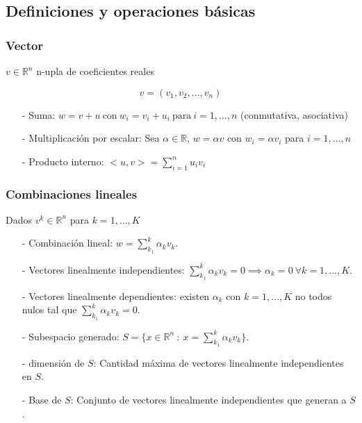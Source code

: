 \subsection{Definiciones y operaciones básicas}\label{subsec:definiciones_y_operaciones_basicas}

\subsubsection{Vector}\label{subsubsec:vector}

$v \in \mathbb{R}^{n}$ n-upla de coeficientes reales

\[ v = (v_1,v_2,\ldots,v_n)\]

\begin{itemize}
    \item[-] Suma: $w = v + u ~\text{con}~ w_i = v_i + u_i ~\text{para}~ i = 1,\ldots,n$ (conmutativa, asociativa)
    \item[-] Multiplicación por escalar: Sea $\alpha \in \mathbb{R}$, $w = \alpha v$ con $w_i = \alpha v_i$ para $i = 1,\ldots,n$
    \item[-] Producto interno: $<u,v> = \sum_{i=1}^{n}u_i v_i$
\end{itemize}

\subsubsection{Combinaciones lineales}\label{subsubsec:combinaciones_lineales}

Dados $v^{k} \in \mathbb{R}^n$ para $k = 1,\ldots,K$

\begin{itemize}
    \item[-] Combinación lineal: $w = \sum_{k_1}^{k}\alpha_k v_{k}$.
    \item[-] Vectores linealmente independientes: $\sum_{k_1}^{k}\alpha_k v_{k} = 0 \implies \alpha_k = 0 ~\forall k = 1,\ldots,K$.
    \item[-] Vectores linealmente dependientes: existen $\alpha_k$ con $k = 1,\ldots, K$ no todos nulos tal que $\sum_{k_1}^{k}\alpha_k v_{k} = 0$.
    \item[-] Subespacio generado: $S = \{x \in \mathbb{R}^{n} ~:~ x = \sum_{k_1}^{k}\alpha_k v_{k}\}$.
    \item[-] dimensión de $S$: Cantidad máxima de vectores linealmente independientes en $S$.
    \item[-] Base de $S$: Conjunto de vectores linealmente independientes que generan a $S$.
\end{itemize}

